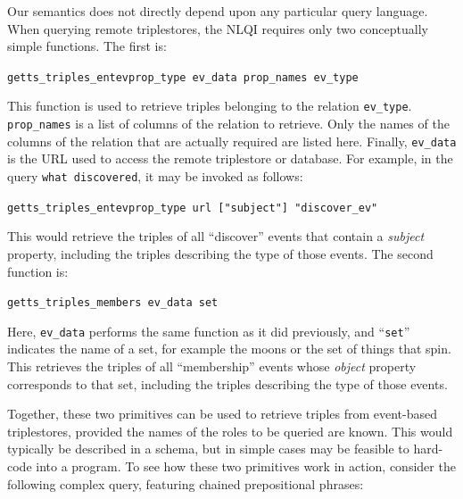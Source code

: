 \documentclass[../main.tex]{subfiles}
\begin{document}
\begin{refsection}
Our semantics does not directly depend upon any particular query language.
When querying remote triplestores, the NLQI requires only two conceptually simple functions.  The first is:

\examplespacing

\texttt{getts\_triples\_entevprop\_type ev\_data prop\_names ev\_type}

\examplespacing

\noindent This function is used to retrieve triples belonging to the relation \texttt{ev\_type}.  \linebreak \texttt{prop\_names} is a list of columns of the relation to retrieve.  Only the names of the columns of the relation that are actually required are listed here.  Finally, \linebreak \texttt{ev\_data} is the URL used to access the remote triplestore or database.  For example, in the query \texttt{what discovered}, it may be invoked as follows:


\examplespacing

\texttt{getts\_triples\_entevprop\_type url ["subject"] "discover\_ev"}

\examplespacing

\noindent This would retrieve the triples of all ``discover'' events that contain a \textit{subject} property, including the triples describing the type of those events.  The second function is:

\examplespacing

\texttt{getts\_triples\_members ev\_data set}

\examplespacing

\noindent Here, \texttt{ev\_data} performs the same function as it did previously, and ``\texttt{set}'' indicates the name of a set, for example the moons or the set of things that spin.  This retrieves the triples of all ``membership'' events whose \textit{object} property corresponds to that set, including the triples describing the type of those events.

Together, these two primitives can be used to retrieve triples from event-based triplestores, provided the names of the roles to be queried are known.  This would typically be described in a schema, but in simple cases may be feasible to hard-code into a program. To see how these two primitives work in action, consider the following complex query, featuring chained prepositional phrases:


\end{refsection}
\end{document}
